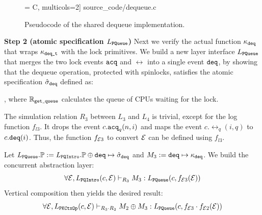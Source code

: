 {\begin{figure}[t]
 = C, multicols=2] {source_code/dequeue.c}
\caption{Pseudocode of the shared dequeue implementation.}
\label{fig:exp:dequeue}
\hrulefill
\end{figure}

\noindent\textbf{Step 2 (atomic specification $L_\pqueue$)}
Next we verify the actual function $\module_{\deq}$ that wraps
$\module_{\deq\comm{\_t}}$ with the lock primitives.
We build a new layer interface $L_\pqueue$ that merges the two lock events
$\acq$ and $\rel$ into a single event $\deq$,
by showing that the dequeue operation, protected with spinlocks,
satisfies the atomic specification $\spec_{\deq}$ defined as:
\begin{mathpar}
\end{mathpar}
, where $\replay_\comm{get\_queue}$
calculates the queue of CPUs waiting for the lock.

The simulation relation 
$R_{3}$ between $L_3$ and $L_4$ is trivial,
except for the log function $f_{l3}$.
It drops the event $c.\acq_q(n,i)$
and maps the event $c.\rel_q(i, q)$
to $c.\deq(i)$. Thus, the function $f_{\oracle 3}$ to convert
$\oracle$ can be defined using $f_{l3}$.
Let $L_\pqueue.\primt := L_\pqintro.\primt \oplus \deq \mapsto \spec_{\deq}$ 
and
$M_3 :=  \deq \mapsto \module_{\deq}$.
We build the concurrent abstraction layer:
\[
\forall \oracle, 
\ltyp{L_\pqintro(c, \oracle)}{R_3}{M_3}{L_\pqueue(c, f_{\oracle 3} (\oracle))}
\]
Vertical composition then yields the desired result:
\[
\forall \oracle, 
\ltyp{L_\pkctxop(c,\oracle)}{R_3\cdot R_2}{M_2 \oplus M_3}{L_\pqueue(c,f_{\oracle 3} \cdot f_{\oracle 2}(\oracle))}
\]

}
